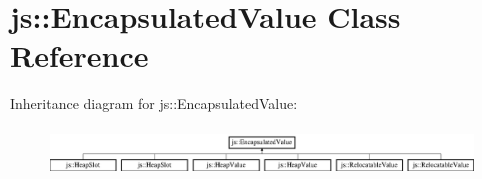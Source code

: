 \hypertarget{classjs_1_1_encapsulated_value}{\section{js\-:\-:Encapsulated\-Value Class Reference}
\label{classjs_1_1_encapsulated_value}
}
Inheritance diagram for js\-:\-:Encapsulated\-Value\-:\begin{figure}[H]
\begin{center}
\leavevmode
\includegraphics[height=1.296296cm]{classjs_1_1_encapsulated_value}
\end{center}
\end{figure}
